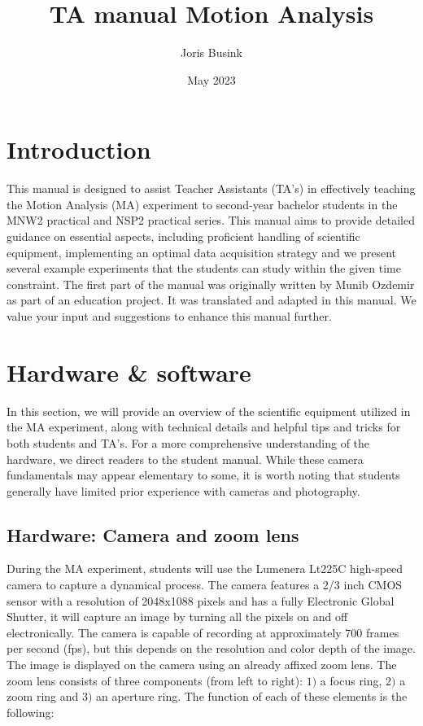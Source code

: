 \documentclass{article}
\title{TA manual Motion Analysis}
\author{Joris Busink}
\date{May 2023}
\begin{document}
\maketitle

\tableofcontents

\newpage

\section{Introduction}
This manual is designed to assist Teacher Assistants (TA's) in effectively teaching the Motion Analysis (MA) experiment to second-year bachelor students in the MNW2 practical and NSP2 practical series. This manual aims to provide detailed guidance on essential aspects, including proficient handling of scientific equipment, implementing an optimal data acquisition strategy and we present several example experiments that the students can study within the given time constraint. The first part of the manual was originally written by Munib Ozdemir as part of an education project. It was translated and adapted in this manual. We value your input and suggestions to enhance this manual further.

\newpage 

\section{Hardware \& software}
In this section, we will provide an overview of the scientific equipment utilized in the MA experiment, along with technical details and helpful tips and tricks for both students and TA's. For a more comprehensive understanding of the hardware, we direct readers to the student manual. While these camera fundamentals may appear elementary to some, it is worth noting that students generally have limited prior experience with cameras and photography. 

\subsection{Hardware: Camera and zoom lens}
During the MA experiment, students will use the Lumenera Lt225C high-speed camera to capture a dynamical process. The camera features a 2/3 inch CMOS sensor with a resolution of 2048x1088 pixels and has a fully Electronic Global Shutter, it will capture an image by turning all the pixels on and off electronically. The camera is capable of recording at approximately 700 frames per second (fps), but this depends on the resolution and color depth of the image. The image is displayed on the camera using an already affixed zoom lens. The zoom lens consists of three components (from left to right): $1)$ a focus ring, 2$)$ a zoom ring and $3)$ an aperture ring. The function of each of these elements is the following:
\end{document}

